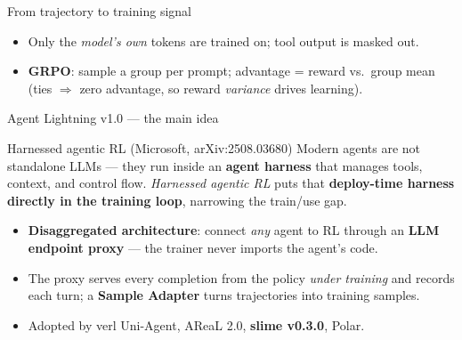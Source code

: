\documentclass[aspectratio=169]{beamer}
\begin{document}
\begin{frame}{From trajectory to training signal}
  \begin{center}
  \end{center}
  \begin{itemize}\setlength\itemsep{0.2em}
    \item Only the \emph{model's own} tokens are trained on; tool output is masked out.
    \item \textbf{GRPO}: sample a group per prompt; advantage = reward vs.\ group mean
      (ties $\Rightarrow$ zero advantage, so reward \emph{variance} drives learning).
  \end{itemize}
\end{frame}

\begin{frame}{Agent Lightning v1.0 --- the main idea}
  \begin{block}{Harnessed agentic RL (Microsoft, arXiv:2508.03680)}
    Modern agents are not standalone LLMs --- they run inside an \textbf{agent harness}
    that manages tools, context, and control flow. \emph{Harnessed agentic RL} puts that
    \textbf{deploy-time harness directly in the training loop}, narrowing the train/use gap.
  \end{block}
  \begin{itemize}\setlength\itemsep{0.25em}
    \item \textbf{Disaggregated architecture}: connect \emph{any} agent to RL through an
      \textbf{LLM endpoint proxy} --- the trainer never imports the agent's code.
    \item The proxy serves every completion from the policy \emph{under training} and records
      each turn; a \textbf{Sample Adapter} turns trajectories into training samples.
    \item Adopted by verl Uni-Agent, AReaL 2.0, \textbf{slime v0.3.0}, Polar.
  \end{itemize}
\end{frame}
\end{document}
